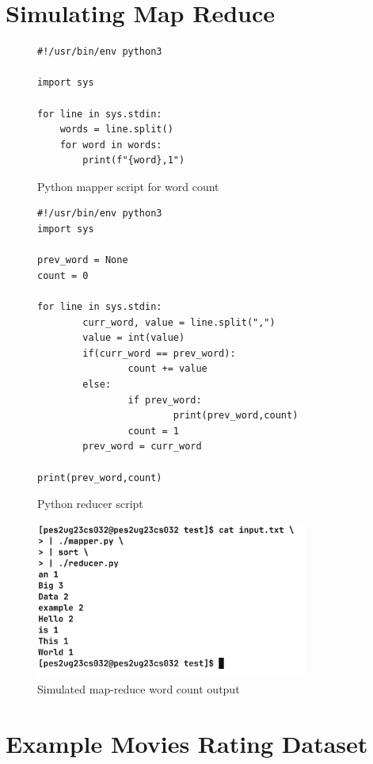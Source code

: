 \documentclass[12pt,a4paper]{article}
\begin{document}
\section{Simulating Map Reduce}

\begin{figure}[H]
\centering
\begin{verbatim}
#!/usr/bin/env python3

import sys

for line in sys.stdin:
    words = line.split()
    for word in words:
        print(f"{word},1")
\end{verbatim}
\caption{Python mapper script for word count}
\end{figure}

\begin{figure}[H]
\centering
\begin{verbatim}
#!/usr/bin/env python3
import sys

prev_word = None
count = 0

for line in sys.stdin:
        curr_word, value = line.split(",")
        value = int(value)
        if(curr_word == prev_word):
                count += value
        else:
                if prev_word:
                        print(prev_word,count)
                count = 1
        prev_word = curr_word

print(prev_word,count)
\end{verbatim}
\caption{Python reducer script}
\end{figure}

\begin{figure}[H]
   \centering
   \includegraphics[width=0.8\textwidth]{./images/img5.png} 
   \caption{Simulated map-reduce word count output}
\end{figure}

\section{Example Movies Rating Dataset}
\end{document}
